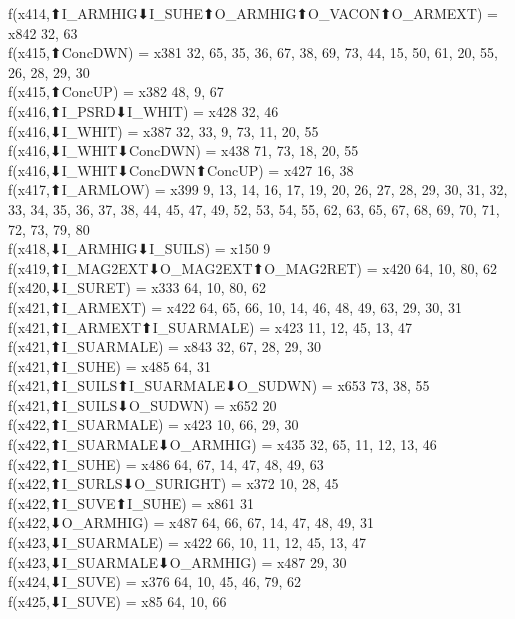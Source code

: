 f(x414,⬆I_ARMHIG⬇I_SUHE⬆O_ARMHIG⬆O_VACON⬆O_ARMEXT) = x842 {32, 63} \\
f(x415,⬆ConcDWN) = x381 {32, 65, 35, 36, 67, 38, 69, 73, 44, 15, 50, 61, 20, 55, 26, 28, 29, 30} \\
f(x415,⬆ConcUP) = x382 {48, 9, 67} \\
f(x416,⬆I_PSRD⬇I_WHIT) = x428 {32, 46} \\
f(x416,⬇I_WHIT) = x387 {32, 33, 9, 73, 11, 20, 55} \\
f(x416,⬇I_WHIT⬇ConcDWN) = x438 {71, 73, 18, 20, 55} \\
f(x416,⬇I_WHIT⬇ConcDWN⬆ConcUP) = x427 {16, 38} \\
f(x417,⬆I_ARMLOW) = x399 {9, 13, 14, 16, 17, 19, 20, 26, 27, 28, 29, 30, 31, 32, 33, 34, 35, 36, 37, 38, 44, 45, 47, 49, 52, 53, 54, 55, 62, 63, 65, 67, 68, 69, 70, 71, 72, 73, 79, 80} \\
f(x418,⬇I_ARMHIG⬇I_SUILS) = x150 {9} \\
f(x419,⬆I_MAG2EXT⬇O_MAG2EXT⬆O_MAG2RET) = x420 {64, 10, 80, 62} \\
f(x420,⬇I_SURET) = x333 {64, 10, 80, 62} \\
f(x421,⬆I_ARMEXT) = x422 {64, 65, 66, 10, 14, 46, 48, 49, 63, 29, 30, 31} \\
f(x421,⬆I_ARMEXT⬆I_SUARMALE) = x423 {11, 12, 45, 13, 47} \\
f(x421,⬆I_SUARMALE) = x843 {32, 67, 28, 29, 30} \\
f(x421,⬆I_SUHE) = x485 {64, 31} \\
f(x421,⬆I_SUILS⬆I_SUARMALE⬇O_SUDWN) = x653 {73, 38, 55} \\
f(x421,⬆I_SUILS⬇O_SUDWN) = x652 {20} \\
f(x422,⬆I_SUARMALE) = x423 {10, 66, 29, 30} \\
f(x422,⬆I_SUARMALE⬇O_ARMHIG) = x435 {32, 65, 11, 12, 13, 46} \\
f(x422,⬆I_SUHE) = x486 {64, 67, 14, 47, 48, 49, 63} \\
f(x422,⬆I_SURLS⬇O_SURIGHT) = x372 {10, 28, 45} \\
f(x422,⬆I_SUVE⬆I_SUHE) = x861 {31} \\
f(x422,⬇O_ARMHIG) = x487 {64, 66, 67, 14, 47, 48, 49, 31} \\
f(x423,⬇I_SUARMALE) = x422 {66, 10, 11, 12, 45, 13, 47} \\
f(x423,⬇I_SUARMALE⬇O_ARMHIG) = x487 {29, 30} \\
f(x424,⬇I_SUVE) = x376 {64, 10, 45, 46, 79, 62} \\
f(x425,⬇I_SUVE) = x85 {64, 10, 66} \\
